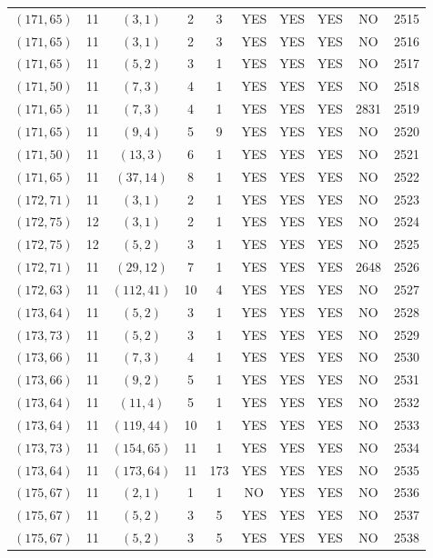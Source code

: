 \begin{longtable}{|c|c|c|c|c|c|c|c|c|c|}
$(171, 65)$ & 11 & $(3, 1)$ & 2 & 3 & YES & YES & YES & NO & 2515\\
$(171, 65)$ & 11 & $(3, 1)$ & 2 & 3 & YES & YES & YES & NO & 2516\\
$(171, 65)$ & 11 & $(5, 2)$ & 3 & 1 & YES & YES & YES & NO & 2517\\
$(171, 50)$ & 11 & $(7, 3)$ & 4 & 1 & YES & YES & YES & NO & 2518\\
$(171, 65)$ & 11 & $(7, 3)$ & 4 & 1 & YES & YES & YES & 2831 & 2519\\
$(171, 65)$ & 11 & $(9, 4)$ & 5 & 9 & YES & YES & YES & NO & 2520\\
$(171, 50)$ & 11 & $(13, 3)$ & 6 & 1 & YES & YES & YES & NO & 2521\\
$(171, 65)$ & 11 & $(37, 14)$ & 8 & 1 & YES & YES & YES & NO & 2522\\
$(172, 71)$ & 11 & $(3, 1)$ & 2 & 1 & YES & YES & YES & NO & 2523\\
$(172, 75)$ & 12 & $(3, 1)$ & 2 & 1 & YES & YES & YES & NO & 2524\\
$(172, 75)$ & 12 & $(5, 2)$ & 3 & 1 & YES & YES & YES & NO & 2525\\
$(172, 71)$ & 11 & $(29, 12)$ & 7 & 1 & YES & YES & YES & 2648 & 2526\\
$(172, 63)$ & 11 & $(112, 41)$ & 10 & 4 & YES & YES & YES & NO & 2527\\
$(173, 64)$ & 11 & $(5, 2)$ & 3 & 1 & YES & YES & YES & NO & 2528\\
$(173, 73)$ & 11 & $(5, 2)$ & 3 & 1 & YES & YES & YES & NO & 2529\\
$(173, 66)$ & 11 & $(7, 3)$ & 4 & 1 & YES & YES & YES & NO & 2530\\
$(173, 66)$ & 11 & $(9, 2)$ & 5 & 1 & YES & YES & YES & NO & 2531\\
$(173, 64)$ & 11 & $(11, 4)$ & 5 & 1 & YES & YES & YES & NO & 2532\\
$(173, 64)$ & 11 & $(119, 44)$ & 10 & 1 & YES & YES & YES & NO & 2533\\
$(173, 73)$ & 11 & $(154, 65)$ & 11 & 1 & YES & YES & YES & NO & 2534\\
$(173, 64)$ & 11 & $(173, 64)$ & 11 & 173 & YES & YES & YES & NO & 2535\\
$(175, 67)$ & 11 & $(2, 1)$ & 1 & 1 & NO & YES & YES & NO & 2536\\
$(175, 67)$ & 11 & $(5, 2)$ & 3 & 5 & YES & YES & YES & NO & 2537\\
$(175, 67)$ & 11 & $(5, 2)$ & 3 & 5 & YES & YES & YES & NO & 2538\\

\end{longtable}
